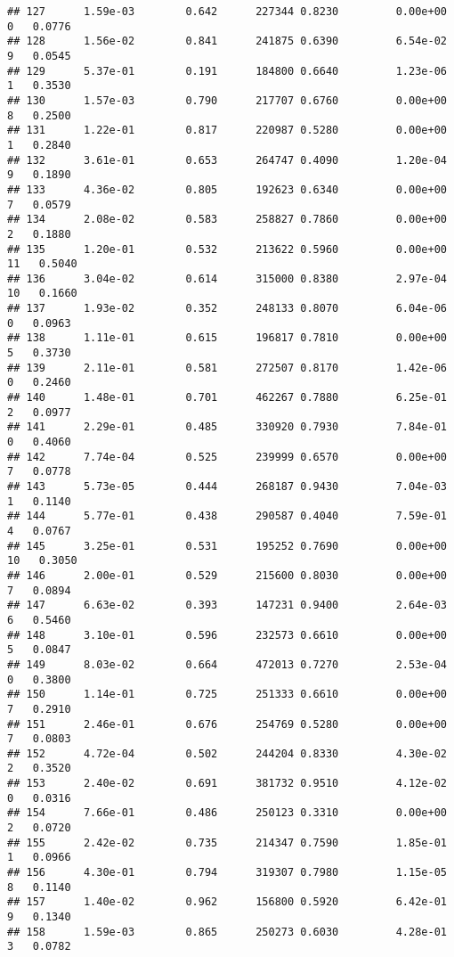 \documentclass[
]{article}
\begin{document}
\begin{verbatim}
## 127      1.59e-03        0.642      227344 0.8230         0.00e+00   0   0.0776
## 128      1.56e-02        0.841      241875 0.6390         6.54e-02   9   0.0545
## 129      5.37e-01        0.191      184800 0.6640         1.23e-06   1   0.3530
## 130      1.57e-03        0.790      217707 0.6760         0.00e+00   8   0.2500
## 131      1.22e-01        0.817      220987 0.5280         0.00e+00   1   0.2840
## 132      3.61e-01        0.653      264747 0.4090         1.20e-04   9   0.1890
## 133      4.36e-02        0.805      192623 0.6340         0.00e+00   7   0.0579
## 134      2.08e-02        0.583      258827 0.7860         0.00e+00   2   0.1880
## 135      1.20e-01        0.532      213622 0.5960         0.00e+00  11   0.5040
## 136      3.04e-02        0.614      315000 0.8380         2.97e-04  10   0.1660
## 137      1.93e-02        0.352      248133 0.8070         6.04e-06   0   0.0963
## 138      1.11e-01        0.615      196817 0.7810         0.00e+00   5   0.3730
## 139      2.11e-01        0.581      272507 0.8170         1.42e-06   0   0.2460
## 140      1.48e-01        0.701      462267 0.7880         6.25e-01   2   0.0977
## 141      2.29e-01        0.485      330920 0.7930         7.84e-01   0   0.4060
## 142      7.74e-04        0.525      239999 0.6570         0.00e+00   7   0.0778
## 143      5.73e-05        0.444      268187 0.9430         7.04e-03   1   0.1140
## 144      5.77e-01        0.438      290587 0.4040         7.59e-01   4   0.0767
## 145      3.25e-01        0.531      195252 0.7690         0.00e+00  10   0.3050
## 146      2.00e-01        0.529      215600 0.8030         0.00e+00   7   0.0894
## 147      6.63e-02        0.393      147231 0.9400         2.64e-03   6   0.5460
## 148      3.10e-01        0.596      232573 0.6610         0.00e+00   5   0.0847
## 149      8.03e-02        0.664      472013 0.7270         2.53e-04   0   0.3800
## 150      1.14e-01        0.725      251333 0.6610         0.00e+00   7   0.2910
## 151      2.46e-01        0.676      254769 0.5280         0.00e+00   7   0.0803
## 152      4.72e-04        0.502      244204 0.8330         4.30e-02   2   0.3520
## 153      2.40e-02        0.691      381732 0.9510         4.12e-02   0   0.0316
## 154      7.66e-01        0.486      250123 0.3310         0.00e+00   2   0.0720
## 155      2.42e-02        0.735      214347 0.7590         1.85e-01   1   0.0966
## 156      4.30e-01        0.794      319307 0.7980         1.15e-05   8   0.1140
## 157      1.40e-02        0.962      156800 0.5920         6.42e-01   9   0.1340
## 158      1.59e-03        0.865      250273 0.6030         4.28e-01   3   0.0782

\end{verbatim}
\end{document}
